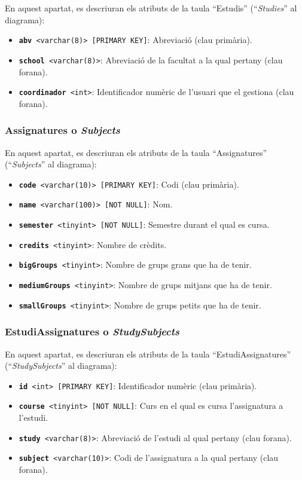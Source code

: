 \documentclass[a4paper,12pt]{ThesisStyle}
\begin{document}
En aquest apartat, es descriuran els atributs de la taula ``Estudis'' (``\textit{Studies}'' al diagrama):
\begin{itemize}
  \item \texttt{\textbf{abv} <varchar(8)> [PRIMARY KEY]}: Abreviació (clau primària).
  \item \texttt{\textbf{school} <varchar(8)>}: Abreviació de la facultat a la qual pertany (clau forana).
  \item \texttt{\textbf{coordinador} <int>}: Identificador numèric de l'usuari que el gestiona (clau forana).
\end{itemize}

\subsubsection{Assignatures o \textit{Subjects}}

En aquest apartat, es descriuran els atributs de la taula ``Assignatures'' (``\textit{Subjects}'' al diagrama):
\begin{itemize}
  \item \texttt{\textbf{code} <varchar(10)> [PRIMARY KEY]}: Codi (clau primària).
  \item \texttt{\textbf{name} <varchar(100)> [NOT NULL]}: Nom.
  \item \texttt{\textbf{semester} <tinyint> [NOT NULL]}: Semestre durant el qual es cursa.
  \item \texttt{\textbf{credits} <tinyint>}: Nombre de crèdits.
  \item \texttt{\textbf{bigGroups} <tinyint>}: Nombre de grups grans que ha de tenir.
  \item \texttt{\textbf{mediumGroups} <tinyint>}: Nombre de grups mitjans que ha de tenir.
  \item \texttt{\textbf{smallGroups} <tinyint>}: Nombre de grups petits que ha de tenir.
\end{itemize}

\subsubsection{EstudiAssignatures o \textit{StudySubjects}}

En aquest apartat, es descriuran els atributs de la taula ``EstudiAssignatures'' (``\textit{StudySubjects}'' al diagrama):
\begin{itemize}
  \item \texttt{\textbf{id} <int> [PRIMARY KEY]}: Identificador numèric (clau primària).
  \item \texttt{\textbf{course} <tinyint> [NOT NULL]}: Curs en el qual es cursa l'assignatura a l'estudi.
  \item \texttt{\textbf{study} <varchar(8)>}: Abreviació de l'estudi al qual pertany (clau forana).
  \item \texttt{\textbf{subject} <varchar(10)>}: Codi de l'assignatura a la qual pertany (clau forana).
\end{itemize}
\end{document}
